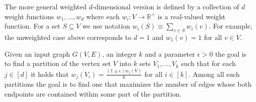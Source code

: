 The more general weighted $d$-dimensional version is defined by a collection of $d$ weight functions $w_1, \dots, w_d$ where each $w_i \colon V \to \mathbb R^+$ is a real-valued weight function. For a set $S \subseteq V$ we use notation $w_i(S) \equiv \sum_{v \in S} w_i(v)$. For example, the unweighted case above corresponds to $d = 1$ and $w_1(v) = 1$ for all $v \in V$.

\begin{definition}
	Given an input graph $G(V, E)$, an integer $k$ and a parameter $\epsilon > 0$ the goal is to find a partition of the vertex set $V$ into $k$ sets $V_1, \dots, V_k$ such that for each $j \in [d]$ it holds that  $w_j(V_i) = \frac{(1\pm \epsilon) w_j(V)}{k}$ for all $i \in [k]$. Among all such partitions the goal is to find one that maximizes the number of edges whose both endpoints are contained within some part of the partition. 
\end{definition}

